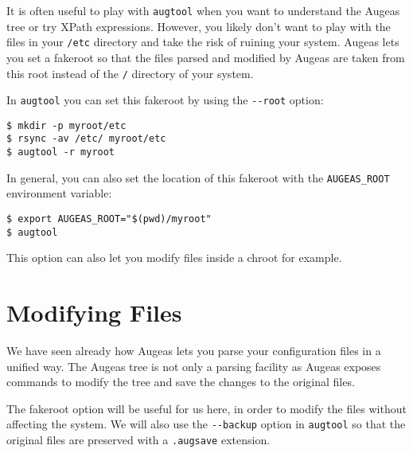 It is often useful to play with \verb!augtool! when you want to understand the Augeas tree or try XPath expressions. However, you likely don't want to play with the files in your \verb!/etc! directory and take the risk of ruining your system. Augeas lets you set a fakeroot so that the files parsed and modified by Augeas are taken from this root instead of the \verb!/! directory of your system.

 

In \verb!augtool! you can set this fakeroot by using the \verb!--root! option:

\begin{verbatim}
$ mkdir -p myroot/etc
$ rsync -av /etc/ myroot/etc
$ augtool -r myroot
\end{verbatim}

In general, you can also set the location of this fakeroot with the \verb!AUGEAS_ROOT! environment variable:

\begin{verbatim}
$ export AUGEAS_ROOT="$(pwd)/myroot"
$ augtool
\end{verbatim}

This option can also let you modify files inside a chroot for example.

\section{Modifying Files}

We have seen already how Augeas lets you parse your configuration files in a unified way. The Augeas tree is not only a parsing facility as Augeas exposes commands to modify the tree and save the changes to the original files.

The fakeroot option will be useful for us here, in order to modify the files without affecting the system. We will also use the \verb!--backup! option in \verb!augtool! so that the original files are preserved with a \verb!.augsave! extension.

     

